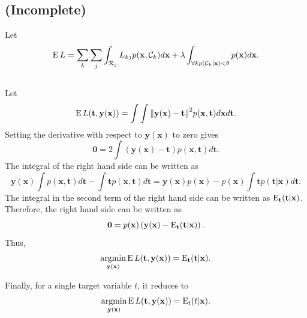 \subsection{(Incomplete)}
\label{1.24}
Let
%
\begin{equation}
\operatorname{E} L 
= 
\sum_{k} 
\sum_{j} 
\int_{\mathcal{R}_j} 
L_{kj} 
p(\mathbf{x}, \mathcal{C}_k) 
d\mathbf{x}
+
\lambda
\int_{\forall k p(\mathcal{C}_k | \mathbf{x}) < \theta}
p(\mathbf{x})
d\mathbf{x}.
\end{equation}
%


\subsection{}
\label{1.25}
Let
%
\begin{equation}
\operatorname{E} L(\mathbf{t}, \mathbf{y} (\mathbf{x})) 
= 
\int 
\int 
\norm{\mathbf{y}(\mathbf{x}) - \mathbf{t}} ^ 2 
p(\mathbf{x}, \mathbf{t}) 
d\mathbf{x} 
d\mathbf{t}.
\end{equation}
%
Setting the derivative with respect to $\mathbf{y}(\mathbf{x})$ to zero gives
%
\begin{equation}
\mathbf{0}
= 
2 
\int 
\left( 
	\mathbf{y} (\mathbf{x}) - \mathbf{t} 
\right) 
p(\mathbf{x}, \mathbf{t}) 
d\mathbf{t}.
\end{equation}
%
The integral of the right hand side can be written as
%
\begin{equation}
\mathbf{y}(\mathbf{x}) 
\int 
p(\mathbf{x}, \mathbf{t}) 
d\mathbf{t} 
- 
\int 
\mathbf{t} p(\mathbf{x}, \mathbf{t}) 
d\mathbf{t} 
=
\mathbf{y}(\mathbf{x})
p(\mathbf{x})
-
p(\mathbf{x})
\int
\mathbf{t}
p(\mathbf{t} | \mathbf{x})
d\mathbf{t}.
\end{equation}
%
The integral in the second term of the right hand side can be written as $\operatorname{E}_\mathbf{t} (\mathbf{t} | \mathbf{x})$.
Therefore, the right hand side can be written as
%
\begin{equation}
\mathbf{0}
=
p(\mathbf{x})
\left(
	\mathbf{y}(\mathbf{x}) 
	- 
	\operatorname{E}_\mathbf{t} (\mathbf{t} | \mathbf{x})
\right).
\end{equation}
%
Thus,
%
\begin{equation}
\operatorname*{arg min}_{\mathbf{y}(\mathbf{x})}
\operatorname{E} L(\mathbf{t}, \mathbf{y} (\mathbf{x}))
= 
\operatorname{E}_\mathbf{t} (\mathbf{t} | \mathbf{x}).
\end{equation}
%

Finally, for a single target variable $t$, it reduces to 
%
\begin{equation}
\operatorname*{arg min}_{\mathbf{y}(\mathbf{x})}
\operatorname{E} L(\mathbf{t}, \mathbf{y} (\mathbf{x}))
= 
\operatorname{E}_t (t | \mathbf{x}).
\end{equation}
%



